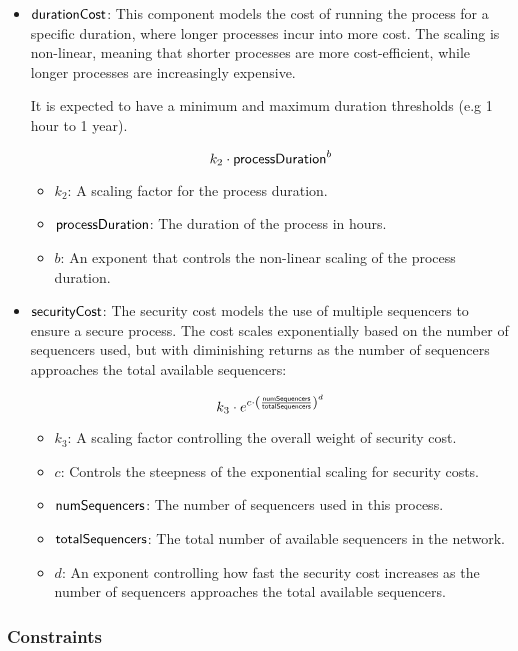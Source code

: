 \begin{itemize}
	\item ${\sf{durationCost}}$: This component models the cost of running the process for a specific duration, where longer processes incur into more cost. The scaling is non-linear, meaning that shorter processes are more cost-efficient, while longer processes are increasingly expensive.
	
	It is expected to have a minimum and maximum duration thresholds (e.g 1 hour to 1 year).
	
	$$ k_2 \cdot {\sf{processDuration}}^b $$
	
	\begin{itemize}
		\item $k_2$: A scaling factor for the process duration.
		\item ${\sf{processDuration}}$: The duration of the process in hours.
		\item $b$: An exponent that controls the non-linear scaling of the process duration.
	\end{itemize}
	
	\item ${\sf{securityCost}}$: The security cost models the use of multiple sequencers to ensure a secure process. The cost scales exponentially based on the number of sequencers used, but with diminishing returns as the number of sequencers approaches the total available sequencers:
	
	$$ k_3 \cdot e^{c \cdot \left( \frac{{\sf{numSequencers}}}{{\sf{totalSequencers}}} \right)^d} $$
	
	\begin{itemize}
		\item $k_3$: A scaling factor controlling the overall weight of security cost.
		\item $c$: Controls the steepness of the exponential scaling for security costs.
		\item ${\sf{numSequencers}}$: The number of sequencers used in this process.
		\item ${\sf{totalSequencers}}$: The total number of available sequencers in the network.
		\item $d$: An exponent controlling how fast the security cost increases as the number of sequencers approaches the total available sequencers.
	\end{itemize}
\end{itemize}

\subsubsection{Constraints}


